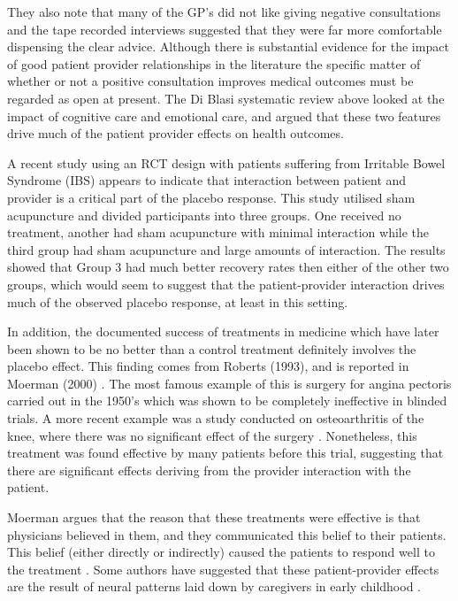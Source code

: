 They also note that many of the GP's did not like giving negative consultations and the tape recorded interviews suggested that they were far more comfortable dispensing the clear advice.  Although there is substantial evidence for the impact of good patient provider relationships in the literature \cite{blasi2001influence}  the specific matter of whether or not a positive consultation improves medical outcomes must be regarded as open at present. The Di Blasi systematic review above looked at the impact of cognitive care and emotional care, and argued that these two features drive much of the patient provider effects on health outcomes. 

A recent study \cite{Kaptchuk2008}  using an RCT design with patients suffering from Irritable Bowel Syndrome (IBS) appears to indicate that interaction between patient and provider is a critical part of the placebo response. This study utilised sham acupuncture and divided participants into three groups. One received no treatment, another had sham acupuncture with minimal interaction while the third group had sham acupuncture and large amounts of interaction. The results showed that Group 3 had much better recovery rates then either of the other two groups, which would seem to suggest that the patient-provider interaction drives much of the observed placebo response, at least in this setting.  

In addition, the documented success of treatments in medicine which have later been shown to be no better than a control treatment definitely involves the placebo effect. This finding comes from Roberts (1993), and is reported in Moerman (2000) \cite{Moerman2000a}.  The most famous example of this is surgery for angina pectoris carried out in the 1950's which was shown to be completely ineffective in blinded trials. A more recent example was a study conducted on osteoarthritis of the knee, where there was no significant effect of the surgery \cite{horng2002placebo}. Nonetheless, this treatment was found effective by many patients before this trial, suggesting that there are significant effects deriving from the provider interaction with the patient.  

Moerman argues that the reason that these treatments were effective is that physicians believed in them, and they communicated this belief to their patients. 
This belief (either directly or indirectly) caused the patients to respond well to the treatment \cite{Moerman2000}. Some authors have suggested that these patient-provider effects are the result of neural patterns laid down by caregivers in early childhood \cite{Kradin2004}.

